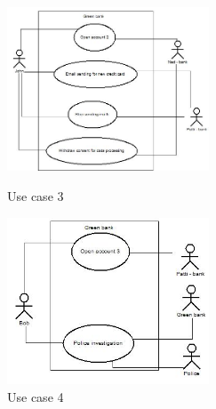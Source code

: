 \documentclass[11pt,english]{article}
\begin{document}
\begin{figure}[H]
\centering
\begin{minipage}{.5\textwidth}
  \centering
  \includegraphics[width=6cm,scale=0.5]{images/use case3.jpg}
  \caption{Use case 3}
  \label{fig:usecase3}
\end{minipage}%
\begin{minipage}{.5\textwidth}
  \centering
  \includegraphics[width=6cm,scale=0.5]{images/use case4.jpg}
  \caption{Use case 4}
  \label{fig:usecase4}
\end{minipage}
\end{figure}
\end{document}
